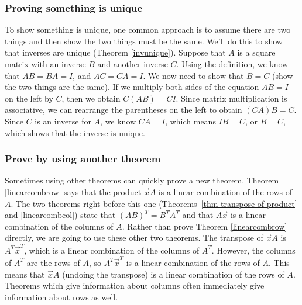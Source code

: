 \subsubsection{Proving something is unique}
To show something is unique, one common approach is to assume there are two things and then show the two things must be the same.  
We'll do this to show that inverses are unique (Theorem \ref{invunique}).  
Suppose that $A$ is a square matrix with an inverse $B$ and another inverse $C$.  
Using the definition, we know that $AB=BA=I$, and $AC=CA=I$.  
We now need to show that $B=C$ (show the two things are the same). 
If we multiply both sides of the equation $AB=I$ on the left by $C$, then we obtain $C(AB)=CI$. 
Since matrix multiplication is associative, we can rearrange the parentheses on the left to obtain $(CA)B=C$.  
Since $C$ is an inverse for $A$, we know $CA=I$, which means $IB=C$, or $B=C$, which shows that the inverse is unique.   



\subsubsection{Prove by using another theorem}
Sometimes using other theorems can quickly prove a new theorem.  
Theorem \ref{linearcombrow} says that the product $\vec x A$ is a linear combination of the rows of $A$.  
The two theorems right before this one (Theorems~\ref{thm transpose of product} and \ref{linearcombcol}) state that $(AB)^T=B^TA^T$ and that $A\vec x$ is a linear combination of the columns of $A$.  
Rather than prove Theorem \ref{linearcombrow} directly, we are going to use these other two theorems.  
The transpose of $\vec x A$ is $A^T\vec x^T$, which is a linear combination of the columns of $A^T$.  
However, the columns of $A^T$ are the rows of $A$, so $A^T\vec x^T$ is a linear combination of the rows of $A$.  
This means that $\vec x A$ (undoing the transpose) is a linear combination of the rows of $A$. 
Theorems which give information about columns often immediately give information about rows as well.



